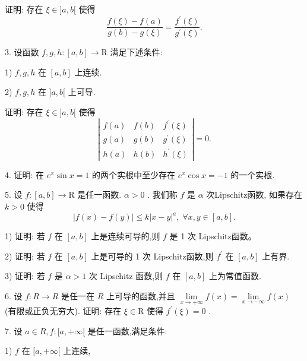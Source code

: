 证明: 存在 $\xi  \in  \rbrack a,b\lbrack$ 使得
$$\frac{f\left( \xi \right)  - f\left( a\right) }{g\left( b\right)  - g\left( \xi \right) } = \frac{{f}^{\prime }\left( \xi \right) }{{g}^{\prime }\left( \xi \right) }.$$

3. 设函数 $f,g,h : \left\lbrack  {a,b}\right\rbrack   \rightarrow  \mathrm{R}$ 满足下述条件:

1) $f,g,h$ 在 $\left\lbrack  {a,b}\right\rbrack$ 上连续.

2) $f,g,h$ 在 $\rbrack a,b\lbrack$ 上可导.

证明: 存在 $\xi  \in  \rbrack a,b\lbrack$ 使得
$$\left| \begin{array}{lll} f\left( a\right) & f\left( b\right) & {f}^{\prime }\left( \xi \right) \\  g\left( a\right) & g\left( b\right) & {g}^{\prime }\left( \xi \right) \\  h\left( a\right) & h\left( b\right) & {h}^{\prime }\left( \xi \right)  \end{array}\right|  = 0.$$

4. 证明: 在 ${e}^{x}\sin x = 1$ 的两个实根中至少存在 ${e}^{x}\cos x =  - 1$ 的一个实根.

5. 设 $f : \left\lbrack  {a,b}\right\rbrack   \rightarrow  \mathrm{R}$ 是任一函数. $\alpha  > 0$ . 我们称 $f$ 是 $\alpha$ 次Lipschitz函数, 如果存在 $k > 0$ 使得
$$\left| {f\left( x\right)  - f\left( y\right) }\right|  \leq  k{\left| x - y\right| }^{a},\;\forall x,y \in  \left\lbrack  {a,b}\right\rbrack  .$$

1) 证明: 若 $f$ 在 $\left\lbrack  {a,b}\right\rbrack$ 上是连续可导的,则 $f$ 是 1 次 Lipschitz函数。

2) 证明: 若 $f$ 在 $\left\lbrack  {a,b}\right\rbrack$ 上是可导的 1 次 Lipschitz函数,则 ${f}^{\prime }$ 在 $\left\lbrack  {a,b}\right\rbrack$ 上有界.

3) 证明: 若 $f$ 是 $\alpha  > 1$ 次 Lipschitz 函数,则 $f$ 在 $\left\lbrack  {a,b}\right\rbrack$ 上为常值函数.

6. 设 $f : R \rightarrow  R$ 是任一在 $R$ 上可导的函数,并且 $\mathop{\lim }\limits_{{x \rightarrow   + \infty }}f\left( x\right)  = \mathop{\lim }\limits_{{x \rightarrow   - \infty }}f\left( x\right)$ (有限或正负无穷大). 证明: 存在 $\xi  \in  \mathrm{R}$ 使得 ${f}^{\prime }\left( \xi \right)  = 0$ .

7. 设 $a \in  R,f : \lbrack a, + \infty \lbrack$ 是任一函数,满足条件:

1) $f$ 在 $\lbrack a, + \infty \lbrack$ 上连续,

